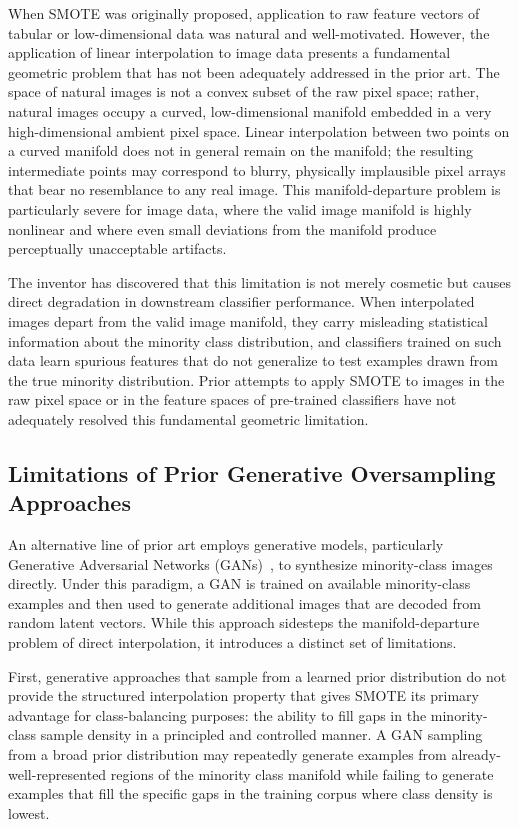 \documentclass[12pt,letterpaper]{article}
\begin{document}
When SMOTE was originally proposed, application to raw feature vectors of
tabular or low-dimensional data was natural and well-motivated.  However, the
application of linear interpolation to image data presents a fundamental
geometric problem that has not been adequately addressed in the prior art.
The space of natural images is not a convex subset of the raw pixel space;
rather, natural images occupy a curved, low-dimensional manifold embedded in
a very high-dimensional ambient pixel space.  Linear interpolation between two
points on a curved manifold does not in general remain on the manifold; the
resulting intermediate points may correspond to blurry, physically implausible
pixel arrays that bear no resemblance to any real image.  This
manifold-departure problem is particularly severe for image data, where the
valid image manifold is highly nonlinear and where even small deviations from
the manifold produce perceptually unacceptable artifacts.

The inventor has discovered that this limitation is not merely cosmetic but
causes direct degradation in downstream classifier performance.  When
interpolated images depart from the valid image manifold, they carry
misleading statistical information about the minority class distribution, and
classifiers trained on such data learn spurious features that do not
generalize to test examples drawn from the true minority distribution.  Prior
attempts to apply SMOTE to images in the raw pixel space or in the feature
spaces of pre-trained classifiers have not adequately resolved this
fundamental geometric limitation.

\subsection{Limitations of Prior Generative Oversampling Approaches}

An alternative line of prior art employs generative models, particularly
Generative Adversarial Networks (GANs)~\cite{goodfellow2014}, to synthesize
minority-class images directly.  Under this paradigm, a GAN is trained on
available minority-class examples and then used to generate additional images
that are decoded from random latent vectors.  While this approach sidesteps
the manifold-departure problem of direct interpolation, it introduces a
distinct set of limitations.

First, generative approaches that sample from a learned prior distribution do
not provide the structured interpolation property that gives SMOTE its primary
advantage for class-balancing purposes: the ability to fill gaps in the
minority-class sample density in a principled and controlled manner.  A GAN
sampling from a broad prior distribution may repeatedly generate examples from
already-well-represented regions of the minority class manifold while failing
to generate examples that fill the specific gaps in the training corpus where
class density is lowest.
\end{document}
